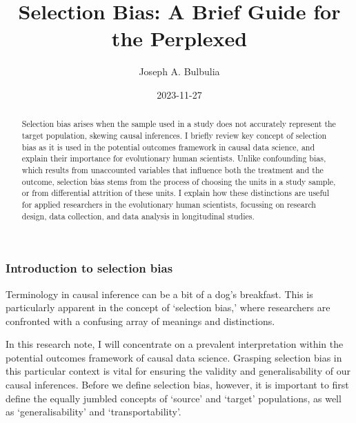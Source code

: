 \documentclass[
  singlecolumn,
  9pt]{article}
\title{Selection Bias: A Brief Guide for the Perplexed}
\author{Joseph A. Bulbulia}
\affil{%
                  Victoria University of Wellington, New Zealand
              }
\date{2023-11-27}
\begin{document}
\maketitle
\begin{abstract}
Selection bias arises when the sample used in a study does not
accurately represent the target population, skewing causal inferences. I
briefly review key concept of selection bias as it is used in the
potential outcomes framework in causal data science, and explain their
importance for evolutionary human scientists. Unlike confounding bias,
which results from unaccounted variables that influence both the
treatment and the outcome, selection bias stems from the process of
choosing the units in a study sample, or from differential attrition of
these units. I explain how these distinctions are useful for applied
researchers in the evolutionary human scientists, focussing on research
design, data collection, and data analysis in longitudinal studies.
\end{abstract}
\subsubsection{Introduction to selection
bias}\label{introduction-to-selection-bias}

Terminology in causal inference can be a bit of a dog's breakfast. This
is particularly apparent in the concept of `selection bias,' where
researchers are confronted with a confusing array of meanings and
distinctions.

In this research note, I will concentrate on a prevalent interpretation
within the potential outcomes framework of causal data science. Grasping
selection bias in this particular context is vital for ensuring the
validity and generalisability of our causal inferences. Before we define
selection bias, however, it is important to first define the equally
jumbled concepts of `source' and `target' populations, as well as
`generalisability' and `transportability'.
\end{document}

